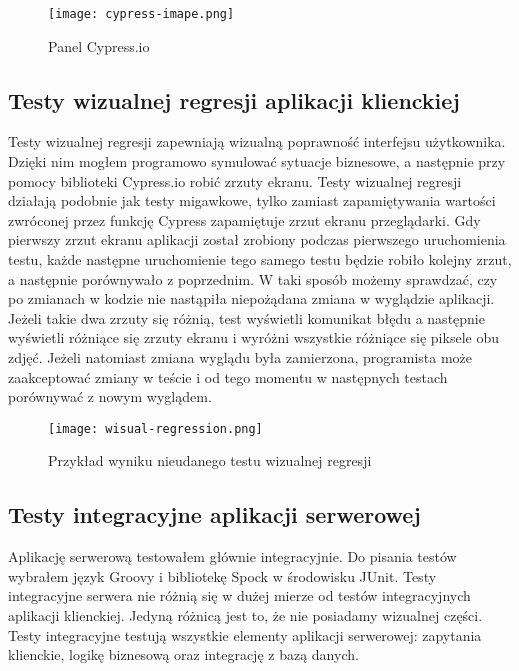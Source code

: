\begin{figure}
    \texttt{[image: cypress-imape.png]}
    \caption{Panel Cypress.io} \label{fig-cypress}
\end{figure}

\subsection{Testy wizualnej regresji aplikacji klienckiej}
Testy wizualnej regresji zapewniają wizualną poprawność interfejsu użytkownika. Dzięki nim mogłem programowo symulować sytuacje biznesowe, a następnie przy pomocy biblioteki Cypress.io robić zrzuty ekranu. Testy wizualnej regresji działają podobnie jak testy migawkowe, tylko zamiast zapamiętywania wartości zwróconej przez funkcję Cypress zapamiętuje zrzut ekranu przeglądarki. Gdy pierwszy zrzut ekranu aplikacji został zrobiony podczas pierwszego uruchomienia testu, każde następne uruchomienie tego samego testu będzie robiło kolejny zrzut, a następnie porównywało z poprzednim. W taki sposób możemy sprawdzać, czy po zmianach w kodzie nie nastąpiła niepożądana zmiana w wyglądzie aplikacji. Jeżeli takie dwa zrzuty się różnią, test wyświetli komunikat błędu a następnie wyświetli różniące się zrzuty ekranu i wyróżni wszystkie różniące się piksele obu zdjęć. Jeżeli natomiast zmiana wyglądu była zamierzona, programista może zaakceptować zmiany w teście i od tego momentu w następnych testach porównywać z nowym wyglądem.

\begin{figure}
    \texttt{[image: wisual-regression.png]}
    \caption{Przykład wyniku nieudanego testu wizualnej regresji} \label{fig-cypress-vr}
\end{figure}


\subsection{Testy integracyjne aplikacji serwerowej}
Aplikację serwerową testowałem głównie integracyjnie. Do pisania testów wybrałem język Groovy i bibliotekę Spock w środowisku JUnit. Testy integracyjne serwera nie różnią się w dużej mierze od testów integracyjnych aplikacji klienckiej. Jedyną różnicą jest to, że nie posiadamy wizualnej części. Testy integracyjne testują wszystkie elementy aplikacji serwerowej: zapytania klienckie, logikę biznesową oraz integrację z bazą danych.
